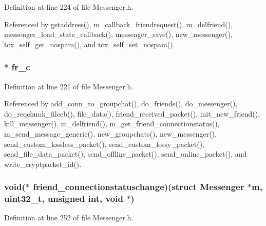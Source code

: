 Definition at line 224 of file Messenger.\+h.



Referenced by getaddress(), m\+\_\+callback\+\_\+friendrequest(), m\+\_\+delfriend(), messenger\+\_\+load\+\_\+state\+\_\+callback(), messenger\+\_\+save(), new\+\_\+messenger(), tox\+\_\+self\+\_\+get\+\_\+nospam(), and tox\+\_\+self\+\_\+set\+\_\+nospam().

\hypertarget{struct_messenger_ae26eb43a606fff20fe70209d051c40f9}{
\subsubsection[{fr\+\_\+c}]{$\ast$ fr\+\_\+c}}\label{struct_messenger_ae26eb43a606fff20fe70209d051c40f9}


Definition at line 221 of file Messenger.\+h.



Referenced by add\+\_\+conn\+\_\+to\+\_\+groupchat(), do\+\_\+friends(), do\+\_\+messenger(), do\+\_\+reqchunk\+\_\+filecb(), file\+\_\+data(), friend\+\_\+received\+\_\+packet(), init\+\_\+new\+\_\+friend(), kill\+\_\+messenger(), m\+\_\+delfriend(), m\+\_\+get\+\_\+friend\+\_\+connectionstatus(), m\+\_\+send\+\_\+message\+\_\+generic(), new\+\_\+groupchats(), new\+\_\+messenger(), send\+\_\+custom\+\_\+lossless\+\_\+packet(), send\+\_\+custom\+\_\+lossy\+\_\+packet(), send\+\_\+file\+\_\+data\+\_\+packet(), send\+\_\+offline\+\_\+packet(), send\+\_\+online\+\_\+packet(), and write\+\_\+cryptpacket\+\_\+id().

\hypertarget{struct_messenger_afb2bb77a40eb1445cc3e67cccc20a6ac}{
\subsubsection[{friend\+\_\+connectionstatuschange}]{\setlength{\rightskip}{0pt plus 5cm}void($\ast$ friend\+\_\+connectionstatuschange)(struct {\bf Messenger} $\ast${\bf m}, uint32\+\_\+t, unsigned int, void $\ast$)}}\label{struct_messenger_afb2bb77a40eb1445cc3e67cccc20a6ac}


Definition at line 252 of file Messenger.\+h.



